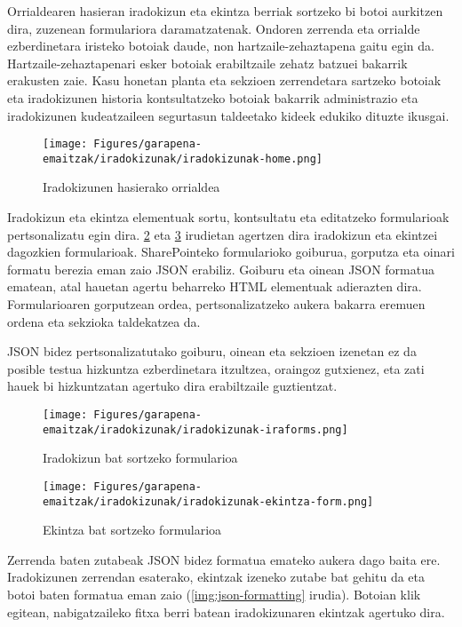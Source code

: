 Orrialdearen hasieran iradokizun eta ekintza berriak sortzeko bi botoi aurkitzen dira, zuzenean formulariora daramatzatenak.
Ondoren zerrenda eta orrialde ezberdinetara iristeko botoiak daude, non hartzaile-zehaztapena gaitu egin da.
Hartzaile-zehaztapenari esker botoiak erabiltzaile zehatz batzuei bakarrik erakusten zaie. 
Kasu honetan planta eta sekzioen zerrendetara sartzeko botoiak eta iradokizunen historia kontsultatzeko botoiak bakarrik administrazio eta iradokizunen kudeatzaileen segurtasun taldeetako kideek edukiko dituzte ikusgai.

\begin{figure}[H]
\centering
\texttt{[image: Figures/garapena-emaitzak/iradokizunak/iradokizunak-home.png]}
\caption{Iradokizunen hasierako orrialdea}
\label{img:iradokizunak-home}
\end{figure}

Iradokizun eta ekintza elementuak sortu, kontsultatu eta editatzeko formularioak pertsonalizatu egin dira. \ref{img:iradokizun-berria} eta \ref{img:ekintza-berria} irudietan agertzen dira iradokizun eta ekintzei dagozkien formularioak.
SharePointeko formularioko goiburua, gorputza eta oinari formatu berezia eman zaio JSON erabiliz.
Goiburu eta oinean JSON formatua ematean, atal hauetan agertu beharreko HTML elementuak adierazten dira.
Formularioaren gorputzean ordea, pertsonalizatzeko aukera bakarra eremuen ordena eta sekzioka taldekatzea da.

JSON bidez pertsonalizatutako goiburu, oinean eta sekzioen izenetan ez da posible testua hizkuntza ezberdinetara itzultzea, oraingoz gutxienez, eta zati hauek bi hizkuntzatan agertuko dira erabiltzaile guztientzat.

\begin{figure}[H]
\vspace{2.25cm}
\centering
\texttt{[image: Figures/garapena-emaitzak/iradokizunak/iradokizunak-iraforms.png]}
\caption{Iradokizun bat sortzeko formularioa}
\label{img:iradokizun-berria}
\end{figure}

\begin{figure}[H]
\vspace{1.5cm}
\centering
\texttt{[image: Figures/garapena-emaitzak/iradokizunak/iradokizunak-ekintza-form.png]}
\caption{Ekintza bat sortzeko formularioa}
\label{img:ekintza-berria}
\end{figure}

Zerrenda baten zutabeak JSON bidez formatua emateko aukera dago baita ere. Iradokizunen zerrendan esaterako, ekintzak izeneko zutabe bat gehitu da eta botoi baten formatua eman zaio (\ref{img:json-formatting} irudia). Botoian klik egitean, nabigatzaileko fitxa berri batean iradokizunaren ekintzak agertuko dira.

